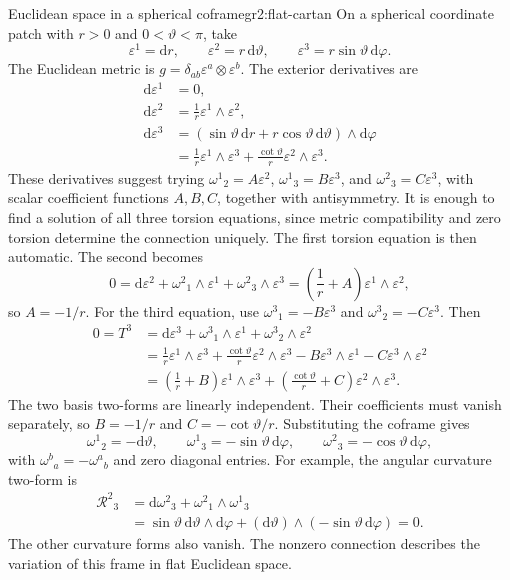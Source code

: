 \documentclass[11pt,a4paper]{article}
\numberwithin{equation}{section}
\newcommand{\dd}{\mathrm d}
\begin{document}
\begin{examplebox}{Euclidean space in a spherical coframe}{gr2:flat-cartan}
On a spherical coordinate patch with \(r>0\) and
\(0<\vartheta<\pi\), take
\[
 \varepsilon^1=\dd r,\qquad
 \varepsilon^2=r\,\dd\vartheta,\qquad
 \varepsilon^3=r\sin\vartheta\,\dd\varphi.
\]
The Euclidean metric is \(g=\delta_{ab}\varepsilon^a\otimes\varepsilon^b\).
The exterior derivatives are
\begin{align*}
 \dd\varepsilon^1&=0,\\
 \dd\varepsilon^2&=\frac1r\varepsilon^1\wedge\varepsilon^2,\\
 \dd\varepsilon^3&=(\sin\vartheta\,\dd r
                   +r\cos\vartheta\,\dd\vartheta)\wedge\dd\varphi\\
 &=\frac1r\varepsilon^1\wedge\varepsilon^3
             +\frac{\cot\vartheta}{r}\varepsilon^2\wedge\varepsilon^3.
\end{align*}
These derivatives suggest trying
\(\omega^1{}_2=A\varepsilon^2\),
\(\omega^1{}_3=B\varepsilon^3\), and
\(\omega^2{}_3=C\varepsilon^3\), with scalar coefficient functions
\(A,B,C\), together with antisymmetry. It is enough to find a solution
of all three torsion equations, since metric compatibility and zero
torsion determine the connection uniquely.
The first torsion equation is then automatic. The second becomes
\[
 0=\dd\varepsilon^2+\omega^2{}_1\wedge\varepsilon^1
                      +\omega^2{}_3\wedge\varepsilon^3
   =\left(\frac1r+A\right)\varepsilon^1\wedge\varepsilon^2,
\]
so \(A=-1/r\). For the third equation, use
\(\omega^3{}_1=-B\varepsilon^3\) and
\(\omega^3{}_2=-C\varepsilon^3\). Then
\begin{align*}
 0=T^3
 &=\dd\varepsilon^3+\omega^3{}_1\wedge\varepsilon^1
                       +\omega^3{}_2\wedge\varepsilon^2\\
 &=\frac1r\varepsilon^1\wedge\varepsilon^3
   +\frac{\cot\vartheta}{r}\varepsilon^2\wedge\varepsilon^3
   -B\varepsilon^3\wedge\varepsilon^1
   -C\varepsilon^3\wedge\varepsilon^2\\
 &=\left(\frac1r+B\right)\varepsilon^1\wedge\varepsilon^3
   +\left(\frac{\cot\vartheta}{r}+C\right)
      \varepsilon^2\wedge\varepsilon^3.
\end{align*}
The two basis two-forms are linearly independent. Their coefficients
must vanish separately, so \(B=-1/r\) and
\(C=-\cot\vartheta/r\). Substituting the coframe gives
\[
 \omega^1{}_2=-\dd\vartheta,\qquad
 \omega^1{}_3=-\sin\vartheta\,\dd\varphi,\qquad
 \omega^2{}_3=-\cos\vartheta\,\dd\varphi,
\]
with \(\omega^b{}_a=-\omega^a{}_b\) and zero diagonal entries.
For example, the angular curvature two-form is
\begin{align*}
 \mathcal R^2{}_3
 &=\dd\omega^2{}_3+\omega^2{}_1\wedge\omega^1{}_3\\
 &=\sin\vartheta\,\dd\vartheta\wedge\dd\varphi
   +(\dd\vartheta)\wedge(-\sin\vartheta\,\dd\varphi)=0.
\end{align*}
The other curvature forms also vanish. The nonzero connection
describes the variation of this frame in flat Euclidean space.
\end{examplebox}
\end{document}
